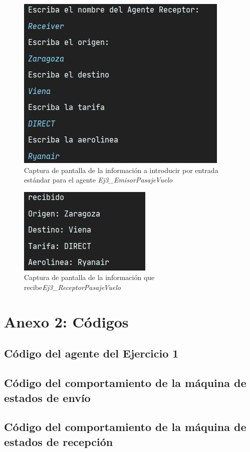 \documentclass[10pt,a4paper]{article}
\begin{document}
\begin{figure}
\centering
\includegraphics[scale=1]{images/sender_ej3.jpg}
\caption{Captura de pantalla de la información a introducir por entrada estándar para el agente \emph{Ej3\_EmisorPasajeVuelo}}
\label{fig:ej3_sender}
\end{figure}

\begin{figure}
\centering
\includegraphics[scale=1]{images/receiver_ej3.jpg}
\caption{Captura de pantalla de la información que recibe\emph{Ej3\_ReceptorPasajeVuelo}}
\label{fig:ej3_reveiver}
\end{figure}

\newpage
\section{Anexo 2: Códigos}

\subsection{Código del agente del Ejercicio 1}



\newpage
\subsection{Código del comportamiento de la máquina de estados de envío}



\newpage
\subsection{Código del comportamiento de la máquina de estados de recepción}


\end{document}
